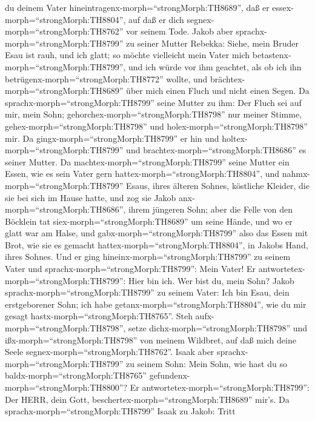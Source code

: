 du deinem Vater hineintragenx-morph=``strongMorph:TH8689'', daß er
essex-morph=``strongMorph:TH8804'', auf daß er dich
segnex-morph=``strongMorph:TH8762'' vor seinem Tode.  Jakob
aber sprachx-morph=``strongMorph:TH8799'' zu seiner Mutter Rebekka:
Siehe, mein Bruder Esau ist rauh, und ich glatt;  so möchte
vielleicht mein Vater mich betastenx-morph=``strongMorph:TH8799'', und
ich würde vor ihm geachtet, als ob ich ihn
betrügenx-morph=``strongMorph:TH8772'' wollte, und
brächtex-morph=``strongMorph:TH8689'' über mich einen Fluch und nicht
einen Segen.  Da sprachx-morph=``strongMorph:TH8799'' seine
Mutter zu ihm: Der Fluch sei auf mir, mein Sohn;
gehorchex-morph=``strongMorph:TH8798'' nur meiner Stimme,
gehex-morph=``strongMorph:TH8798'' und
holex-morph=``strongMorph:TH8798'' mir.  Da
gingx-morph=``strongMorph:TH8799'' er hin und
holtex-morph=``strongMorph:TH8799'' und
brachtex-morph=``strongMorph:TH8686'' es seiner Mutter. Da
machtex-morph=``strongMorph:TH8799'' seine Mutter ein Essen, wie es sein
Vater gern hattex-morph=``strongMorph:TH8804'',  und
nahmx-morph=``strongMorph:TH8799'' Esaus, ihres älteren Sohnes,
köstliche Kleider, die sie bei sich im Hause hatte, und zog sie Jakob
anx-morph=``strongMorph:TH8686'', ihrem jüngeren Sohn; 
aber die Felle von den Böcklein tat siex-morph=``strongMorph:TH8689'' um
seine Hände, und wo er glatt war am Halse,  und
gabx-morph=``strongMorph:TH8799'' also das Essen mit Brot, wie sie es
gemacht hattex-morph=``strongMorph:TH8804'', in Jakobs Hand, ihres
Sohnes.  Und er ging hineinx-morph=``strongMorph:TH8799''
zu seinem Vater und sprachx-morph=``strongMorph:TH8799'': Mein Vater! Er
antwortetex-morph=``strongMorph:TH8799'': Hier bin ich. Wer bist du,
mein Sohn?  Jakob sprachx-morph=``strongMorph:TH8799'' zu
seinem Vater: Ich bin Esau, dein erstgeborener Sohn; ich habe
getanx-morph=``strongMorph:TH8804'', wie du mir gesagt
hastx-morph=``strongMorph:TH8765''. Steh
aufx-morph=``strongMorph:TH8798'', setze
dichx-morph=``strongMorph:TH8798'' und ißx-morph=``strongMorph:TH8798''
von meinem Wildbret, auf daß mich deine Seele
segnex-morph=``strongMorph:TH8762''.  Isaak aber
sprachx-morph=``strongMorph:TH8799'' zu seinem Sohn: Mein Sohn, wie hast
du so baldx-morph=``strongMorph:TH8765''
gefundenx-morph=``strongMorph:TH8800''? Er
antwortetex-morph=``strongMorph:TH8799'': Der HERR, dein Gott,
beschertex-morph=``strongMorph:TH8689'' mir's.  Da
sprachx-morph=``strongMorph:TH8799'' Isaak zu Jakob: Tritt
